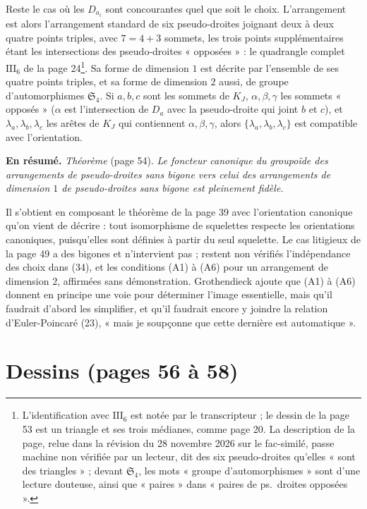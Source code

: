 \documentclass[11pt,a4paper]{article}
\begin{document}
Reste le cas où les $D_{a_i}$ sont concourantes quel que soit le choix.
L'arrangement est alors l'arrangement standard de six pseudo-droites joignant
deux à deux quatre points triples, avec $7 = 4 + 3$ sommets, les trois points
supplémentaires étant les intersections des pseudo-droites « opposées » : le
quadrangle complet $\mathrm{III}_6$ de la page 24\footnote{L'identification
avec $\mathrm{III}_6$ est notée par le transcripteur ; le dessin de la page
53 est un triangle et ses trois médianes, comme page 20. La description de la
page, relue dans la
révision du 28 novembre 2026 sur le fac-similé, passe machine non vérifiée par un lecteur,
dit des six pseudo-droites qu'elles « sont des triangles » ; devant
$\mathfrak{S}_4$, les mots « groupe d'automorphismes » sont d'une lecture
douteuse, ainsi que « paires » dans « paires de ps.\ droites opposées ».}. Sa forme de
dimension $1$ est décrite par l'ensemble de ses quatre points triples, et sa
forme de dimension $2$ aussi, de groupe d'automorphismes $\mathfrak{S}_4$. Si
$a, b, c$ sont les sommets de $K_J$, $\alpha, \beta, \gamma$ les sommets
« opposés » ($\alpha$ est l'intersection de $D_a$ avec la pseudo-droite qui
joint $b$ et $c$), et $\lambda_a, \lambda_b, \lambda_c$ les arêtes de $K_J$ qui
contiennent $\alpha, \beta, \gamma$, alors $\{\lambda_a, \lambda_b,
\lambda_c\}$ est compatible avec l'orientation.

\textbf{En résumé.} \emph{Théorème} (page 54). \emph{Le foncteur canonique du
groupoïde des arrangements de pseudo-droites sans bigone vers celui des
arrangements de dimension $1$ de pseudo-droites sans bigone est pleinement
fidèle.}

Il s'obtient en composant le théorème de la page 39 avec l'orientation
canonique qu'on vient de décrire : tout isomorphisme de squelettes respecte
les orientations canoniques, puisqu'elles sont définies à partir du seul
squelette. Le cas litigieux de la page 49 a des bigones et n'intervient
pas ; restent non vérifiés l'indépendance des choix dans (34), et les
conditions (A1) à (A6) pour un arrangement de dimension $2$, affirmées sans
démonstration. Grothendieck ajoute que (A1) à (A6) donnent en principe une
voie pour déterminer l'image essentielle, mais qu'il faudrait d'abord les
simplifier, et qu'il faudrait encore y joindre la relation d'Euler-Poincaré
(23), « mais je soupçonne que cette dernière est automatique ».

\section*{Dessins (pages 56 à 58)}
\end{document}
